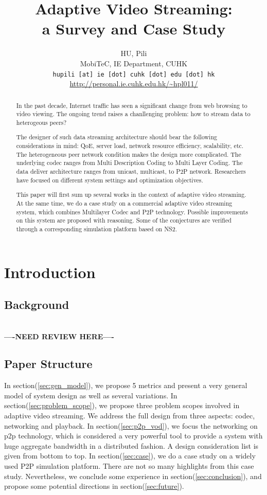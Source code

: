 \documentclass[11pt,a4paper]{article}
\author{HU, Pili \\
MobiTeC, IE Department, CUHK \\
\texttt{hupili [at] ie [dot] cuhk [dot] edu [dot] hk} \\
\url{http://personal.ie.cuhk.edu.hk/~hpl011/} 
}
\title{Adaptive Video Streaming: 
 \\ a Survey and Case Study}
\newcommand{\question}{\textbf{\\----NEED REVIEW HERE----\\}}
\begin{document}
\maketitle

\begin{abstract}
	In the past decade, Internet traffic has seen a significant 
	change from web browsing to video viewing. The ongoing trend 
	raises a chanllenging problem: how to stream data to heterogeous 
	peers? 
	
	The designer of such data streaming architecture should 
	bear the following considerations in mind: QoE, server load, 
	network resource efficiency, scalability, etc. The heterogeneous 
	peer network condition makes the design more complicated. The 
	underlying codec ranges from Multi Description Coding to Multi 
	Layer Coding. The data deliver architecture ranges from unicast,
	multicast, to P2P network. Researchers have focused on different 
	system settings and optimization objectives. 
	 
	This paper will first
	sum up several works in the context of adaptive video streaming. 
	At the same time, we do a case study on a commercial adaptive 
	video streaming system, which combines Multilayer Codec and P2P 
	technology. Possible improvements on this system are proposed
	with reasoning. Some of the conjectures are
	verified through a corresponding simulation platform based on NS2. 
\end{abstract}

\pagebreak
\tableofcontents
\pagebreak

\section{Introduction}

\subsection{Background}

\question

\subsection{Paper Structure}
In section(\ref{sec:gen_model}), we propose 5 metrics and 
present a very general model 
of system design as well as several variations. In section(\ref{sec:problem_scope}), 
we propose three problem scopes involved in adaptive video streaming. 
We address the full design from three aspects: codec, networking and playback. 
In section(\ref{sec:p2p_vod}), we focus the networking on p2p technology, 
which is considered a very powerful tool to provide a system with huge 
aggregate bandwidth in a distributed fashion. A design consideration 
list is given from bottom to top. In section(\ref{sec:case}), we do 
a case study on a widely used P2P simulation platform\cite{huang2010simulation}. 
There are not so many highlights from this case study. Nevertheless, 
we conclude some experience in section(\ref{sec:conclusion}), and 
propose some potential directions in section(\ref{sec:future}). 
\end{document}
